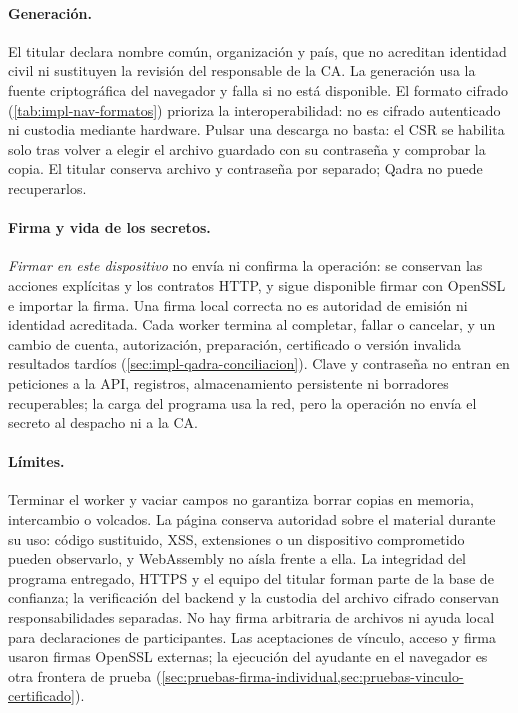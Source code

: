 \paragraph{Generación.} El titular declara nombre común, organización y país,
que no acreditan identidad civil ni sustituyen la revisión del responsable de
la CA. La generación usa la fuente criptográfica del navegador y falla si no
está disponible. El formato cifrado (\cref{tab:impl-nav-formatos}) prioriza la
interoperabilidad: no es cifrado autenticado ni custodia mediante hardware.
Pulsar una descarga no basta: el CSR se habilita solo tras volver a elegir el
archivo guardado con su contraseña y comprobar la copia. El titular conserva archivo y contraseña por
separado; Qadra no puede recuperarlos.

\paragraph{Firma y vida de los secretos.} \emph{Firmar en este dispositivo}
no envía ni confirma la operación: se conservan las
acciones explícitas y los contratos HTTP, y sigue disponible firmar con OpenSSL
e importar la firma. Una firma local correcta no es autoridad de emisión ni
identidad acreditada. Cada worker termina al completar, fallar o
cancelar, y un cambio de cuenta, autorización, preparación, certificado o
versión invalida resultados tardíos (\cref{sec:impl-qadra-conciliacion}). Clave
y contraseña no entran en peticiones a la API, registros, almacenamiento
persistente ni borradores recuperables; la carga del programa usa la red, pero
la operación no envía el secreto al despacho ni a la CA.

\paragraph{Límites.} Terminar el worker y vaciar campos no garantiza borrar
copias en memoria, intercambio o volcados. La página conserva autoridad sobre
el material durante su uso: código sustituido, XSS, extensiones o un
dispositivo comprometido pueden observarlo, y WebAssembly no aísla frente a
ella. La integridad del programa entregado, HTTPS y el equipo del titular
forman parte de la base de confianza; la verificación del backend y la
custodia del archivo cifrado conservan responsabilidades separadas. No hay
firma arbitraria de archivos ni ayuda local para declaraciones de
participantes. Las aceptaciones de vínculo, acceso y firma usaron firmas
OpenSSL externas; la ejecución del ayudante en el navegador es otra frontera de
prueba (\cref{sec:pruebas-firma-individual,sec:pruebas-vinculo-certificado}).

